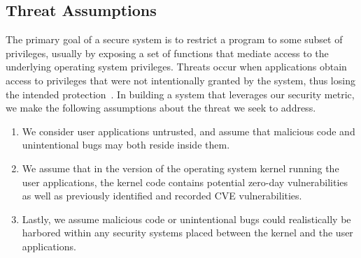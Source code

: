\subsection{Threat Assumptions}

The primary goal of a secure system is to restrict a program to some subset
of privileges, 
usually by exposing a set of functions that mediate access to the
underlying operating system privileges. 
Threats occur when applications obtain access to privileges that were not
intentionally granted by the system, 
thus losing the intended protection~\cite{Repy-10}. In building a system
that leverages our security metric, 
we make the following assumptions about the threat we seek to address.

\begin{enumerate}
\item We consider user applications untrusted, and assume that malicious
code and unintentional bugs may both reside inside them.

\item We assume that in the version of the operating system kernel running
the user applications, 
the kernel code contains potential zero-day vulnerabilities as well as
previously identified and recorded CVE vulnerabilities.

\item Lastly, we assume malicious code or unintentional bugs could
realistically be harbored 
within any security systems placed between the kernel and the user
applications.
\end{enumerate}

